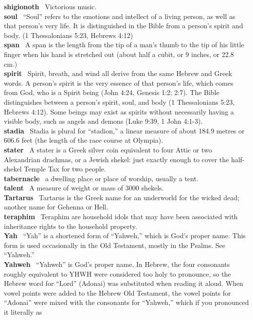 \textbf{shigionoth}~ Victorious music.\\
\textbf{soul}~ ``Soul'' refers to the emotions and intellect of a living
person, as well as that person's very life. It is distinguished in the
Bible from a person's spirit and body. (1 Thessalonians 5:23, Hebrews
4:12)\\
\textbf{span}~ A span is the length from the tip of a man's thumb to the
tip of his little finger when his hand is stretched out (about half a
cubit, or 9 inches, or 22.8 cm.)\\
\textbf{spirit}~ Spirit, breath, and wind all derive from the same
Hebrew and Greek words. A person's spirit is the very essence of that
person's life, which comes from God, who is a Spirit being (John 4:24,
Genesis 1:2; 2:7). The Bible distinguishes between a person's spirit,
soul, and body (1 Thessalonians 5:23, Hebrews 4:12). Some beings may
exist as spirits without necessarily having a visible body, such as
angels and demons (Luke 9:39, 1 John 4:1-3).\\
\textbf{stadia}~ Stadia is plural for ``stadion,'' a linear measure of
about 184.9 metres or 606.6 feet (the length of the race course at
Olympia).\\
\textbf{stater}~ A stater is a Greek silver coin equivalent to four
Attic or two Alexandrian drachmas, or a Jewish shekel: just exactly
enough to cover the half-shekel Temple Tax for two people.\\
\textbf{tabernacle}~ a dwelling place or place of worship, usually a
tent.\\
\textbf{talent}~ A measure of weight or mass of 3000 shekels.\\
\textbf{Tartarus}~ Tartarus is the Greek name for an underworld for the
wicked dead; another name for Gehenna or Hell.\\
\textbf{teraphim}~ Teraphim are household idols that may have been
associated with inheritance rights to the household property.\\
\textbf{Yah}~ ``Yah'' is a shortened form of ``Yahweh,'' which is God's
proper name. This form is used occasionally in the Old Testament, mostly
in the Psalms. See ``Yahweh.''\\
\textbf{Yahweh}~ ``Yahweh'' is God's proper name. In Hebrew, the four
consonants roughly equivalent to YHWH were considered too holy to
pronounce, so the Hebrew word for ``Lord'' (Adonai) was substituted when
reading it aloud. When vowel points were added to the Hebrew Old
Testament, the vowel points for ``Adonai'' were mixed with the
consonants for ``Yahweh,'' which if you pronounced it literally as
